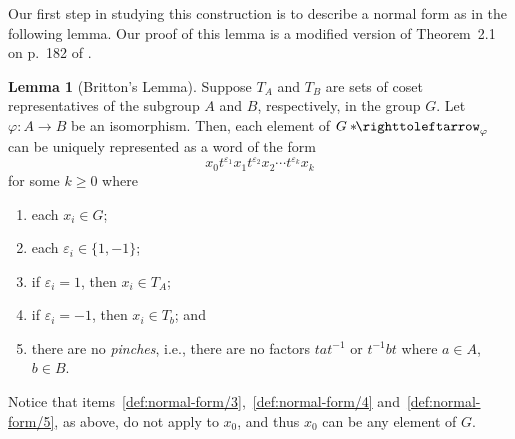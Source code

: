 \documentclass[11pt,a4paper,reqno]{amsart}
\theoremstyle{plain}
\theoremstyle{definition}
\newtheorem{lemma}[theorem]{Lemma}
\theoremstyle{definition}
\renewcommand\geq\geqslant
\newcommand\hnn{*\!\!\righttoleftarrow}
\begin{document}
Our first step in studying this construction is to describe a normal form as in the following lemma.
Our proof of this lemma is a modified version of Theorem~2.1 on p.~182 of \cite{lyndon2001}.

\begin{lemma}[Britton's Lemma]\label{def:normal-form}
	Suppose $T_A$ and $T_B$ are sets of coset representatives of the subgroup $A$ and $B$, respectively, in the group $G$.
	Let $\varphi\colon A\to B$ be an isomorphism.
	Then, each element of $G\hnn_\varphi$ can be uniquely represented as a word of the form
	\begin{equation}\label{eq:normal-form}
		x_0 t^{\varepsilon_1} x_1 t^{\varepsilon_2} x_2 \cdots t^{\varepsilon_k} x_k
	\end{equation}
	for some $k\geq 0$ where
	\begin{enumerate}
		\item\label{def:normal-form/1} each $x_i \in G$;
		\item\label{def:normal-form/2} each $\varepsilon_i \in \{1,-1\}$;
		\item\label{def:normal-form/3} if $\varepsilon_i = 1$, then $x_i \in T_A$;
		\item\label{def:normal-form/4} if $\varepsilon_i = -1$, then $x_i \in T_b$; and
		\item\label{def:normal-form/5} there are no \emph{pinches}, i.e., there are no factors $tat^{-1}$ or $t^{-1}bt$ where $a\in A$, $b\in B$.
	\end{enumerate}
	Notice that items~\ref{def:normal-form/3},~\ref{def:normal-form/4} and~\ref{def:normal-form/5}, as above, do not apply to $x_0$, and thus $x_0$ can be any element of $G$.
\end{lemma}
\end{document}

